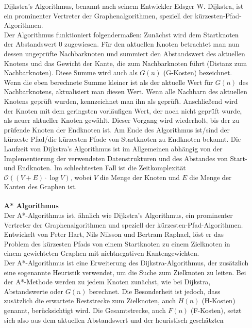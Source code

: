 \begin{itemize}
    Dijkstra's Algorithmus, benannt nach seinem Entwickler Edsger W. Dijkstra, ist ein prominenter Vertreter der Graphenalgorithmen,
    speziell der kürzesten-Pfad-Algorithmen. \cite{dijkstra1959}\\
    Der Algorithmus funktioniert folgendermaßen: Zunächst wird dem Startknoten der Abstandswert $0$ zugewiesen.
    Für den aktuellen Knoten betrachtet man nun dessen ungeprüfte Nachbarknoten und summiert den Abstandswert des aktuellen
    Knotens und das Gewicht der Kante, die zum Nachbarknoten führt (Distanz zum Nachbarknoten).
    Diese Summe wird auch als $G(n)$ (G-Kosten) bezeichnet.
    Wenn die eben berechnete Summe kleiner ist als der aktuelle Wert für $G(n)$ des Nachbarknotens, aktualisiert man diesen Wert.
    Wenn alle Nachbarn des aktuellen Knotens geprüft wurden, kennzeichnet man ihn als geprüft.
    Anschließend wird der Knoten mit dem geringsten vorläufigen Wert, der noch nicht geprüft wurde, als neuer aktueller Knoten gewählt.
    Dieser Vorgang wird wiederholt, bis der zu prüfende Knoten der Endknoten ist.
    Am Ende des Algorithmus ist/sind der kürzeste Pfad/die kürzesten Pfade von Startknoten zu Endknoten bekannt.
    Die Laufzeit von Dijkstra's Algorithmus ist im Allgemeinen abhängig von der Implementierung der verwendeten Datenstrukturen
    und des Abstandes von Start- und Endknoten. \cite{dijkstra1959}
    Im schlechtesten Fall ist die Zeitkomplexität $\mathcal{O}((V+E)\cdot\log V)$, wobei $V$ die Menge der Knoten und $E$
    die Menge der Kanten des Graphen ist. \cite{cormen2022}\\\\
    \textbf{A* Algorithmus}\\
    Der A*-Algorithmus ist, ähnlich wie Dijkstra's Algorithmus, ein prominenter Vertreter der Graphenalgorithmen und speziell
    der kürzesten-Pfad-Algorithmen.
    Entwickelt von Peter Hart, Nils Nilsson und Bertram Raphael, löst er das Problem des kürzesten Pfads von einem Startknoten
    zu einem Zielknoten in einem gewichteten Graphen mit nichtnegativen Kantengewichten. \cite{hart1968}\\
    Der A*-Algorithmus ist eine Erweiterung des Dijkstra-Algorithmus, der zusätzlich eine sogenannte Heuristik verwendet,
    um die Suche zum Zielknoten zu leiten.
    Bei der A*-Methode werden zu jedem Knoten zunächst, wie bei Dijkstra, Abstandswerte oder $G(n)$ berechnet.
    Die Besonderheit ist jedoch, dass zusätzlich die erwartete Reststrecke zum Zielknoten, auch $H(n)$ (H-Kosten) genannt, berücksichtigt wird.
    Die Gesamtstrecke, auch $F(n)$ (F-Kosten), setzt sich also aus dem aktuellen Abstandswert und der heuristisch geschätzten

\end{itemize}

